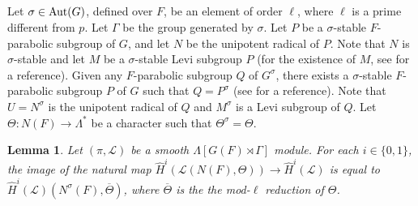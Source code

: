 \documentclass[10pt, reqno]{amsart}
\theoremstyle{plain}
\numberwithin{equation}{section} \newcommand{\di}{\operatorname{dim}}
\newtheorem{lemma}[theorem]{Lemma}
\begin{document}
\subsection{}
Let $\sigma\in {\rm Aut}(G)$, defined over $F$, be an element of order
$\ell$, where $\ell$ is a prime different from $p$. Let $\Gamma$ be
the group generated by $\sigma$. Let $P$ be a $\sigma$-stable
$F$-parabolic subgroup of $G$, and let $N$ be the unipotent radical of
$P$. Note that $N$ is $\sigma$-stable and let $M$ be a $\sigma$-stable
Levi subgroup $P$ (for the existence of $M$, see \cite[Lemma
12.5.4]{Prasad_Kaletha_Bruhat_Tits} for a reference).  Given any
$F$-parabolic subgroup $Q$ of $G^\sigma$, there exists a
$\sigma$-stable $F$-parabolic subgroup $P$ of $G$ such that
$Q=P^\sigma$ (see \cite[Lemma 12.5.4]{Prasad_Kaletha_Bruhat_Tits} for
a reference). Note that $U=N^\sigma$ is the unipotent radical of $Q$
and $M^\sigma$ is a Levi subgroup of $Q$.  Let
$\Theta:N(F)\rightarrow \Lambda^\ast$ be a character such that
$\Theta^\sigma = \Theta$.
\begin{lemma}\label{Tate_image}
Let $(\pi,\mathcal{L})$ be a smooth
$\Lambda[G(F)\rtimes \Gamma]$ module.
For each $i\in\{0,1\}$, the image of the natural map
$\widehat{H}^i(\mathcal{L}(N(F), \Theta))\rightarrow
\widehat{H}^i(\mathcal{L})$ is equal to
 $\widehat{H}^i(\mathcal{L}) (N^\sigma(F),\overline{\Theta})$, where
 $\overline{\Theta}$ is the the mod-$\ell$ reduction of $\Theta$.
\end{lemma}
\end{document}
